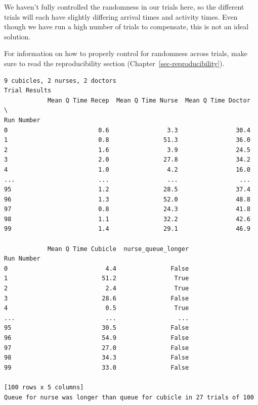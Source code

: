 \documentclass[
  letterpaper,
  DIV=11,
  numbers=noendperiod]{scrreprt}
\begin{document}
\begin{tcolorbox}[enhanced jigsaw, rightrule=.15mm, colback=white, colframe=quarto-callout-warning-color-frame, colbacktitle=quarto-callout-warning-color!10!white, toprule=.15mm, coltitle=black, opacityback=0, titlerule=0mm, bottomtitle=1mm, breakable, title=\textcolor{quarto-callout-warning-color}{\faExclamationTriangle}\hspace{0.5em}{Warning}, opacitybacktitle=0.6, toptitle=1mm, arc=.35mm, bottomrule=.15mm, leftrule=.75mm, left=2mm]

We haven't fully controlled the randomness in our trials here, so the
different trials will each have slightly differing arrival times and
activity times. Even though we have run a high number of trials to
compensate, this is not an ideal solution.

For information on how to properly control for randomness across trials,
make sure to read the reproducibility section
(Chapter~\ref{sec-reproducibility}).

\end{tcolorbox}

\begin{verbatim}
9 cubicles, 2 nurses, 2 doctors
Trial Results
            Mean Q Time Recep  Mean Q Time Nurse  Mean Q Time Doctor  \
Run Number                                                             
0                         0.6                3.3                30.4   
1                         0.8               51.3                36.0   
2                         1.6                3.9                24.5   
3                         2.0               27.8                34.2   
4                         1.0                4.2                16.0   
...                       ...                ...                 ...   
95                        1.2               28.5                37.4   
96                        1.3               52.0                48.8   
97                        0.8               24.3                41.8   
98                        1.1               32.2                42.6   
99                        1.4               29.1                46.9   

            Mean Q Time Cubicle  nurse_queue_longer  
Run Number                                           
0                           4.4               False  
1                          51.2                True  
2                           2.4                True  
3                          28.6               False  
4                           0.5                True  
...                         ...                 ...  
95                         30.5               False  
96                         54.9               False  
97                         27.0               False  
98                         34.3               False  
99                         33.0               False  

[100 rows x 5 columns]
Queue for nurse was longer than queue for cubicle in 27 trials of 100
\end{verbatim}
\end{document}
